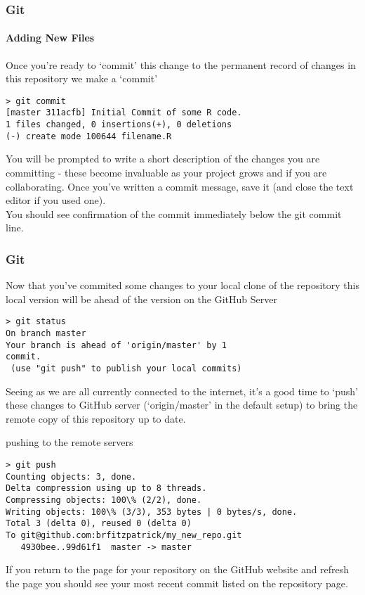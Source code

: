 \documentclass[xcolor=dvipsnames]{beamer}
\begin{document}
\begin{frame}[fragile]
\frametitle{Git}
\framesubtitle{Adding New Files}
Once you're ready to `commit' this change to the permanent record of changes in this repository we make a `commit'
\begin{block}{}
\begin{lstlisting}
> git commit
[master 311acfb] Initial Commit of some R code.
1 files changed, 0 insertions(+), 0 deletions
(-) create mode 100644 filename.R
\end{lstlisting}
\end{block}
You will be prompted to write a short description of the changes you are committing - these become invaluable as your project grows and if you are collaborating.
Once you've written a commit message, save it (and close the text editor if you used one).\\
You should see confirmation of the commit immediately below the git commit line.
\end{frame}

\begin{frame}[fragile]
\frametitle{Git}
Now that you've commited some changes to your local clone of the repository this local version will be ahead of the version on the GitHub Server
\begin{block}{}
\begin{lstlisting}
> git status
On branch master
Your branch is ahead of 'origin/master' by 1
commit.
 (use "git push" to publish your local commits)
\end{lstlisting}
\end{block}
Seeing as we are all currently connected to the internet, it's a good time to `push' these changes to GitHub server (`origin/master' in the default setup) to bring the remote copy of this repository up to date.
\end{frame}

\begin{frame}[fragile]
\begin{block}{pushing to the remote servers}
\begin{lstlisting}
> git push
Counting objects: 3, done.
Delta compression using up to 8 threads.
Compressing objects: 100\% (2/2), done.
Writing objects: 100\% (3/3), 353 bytes | 0 bytes/s, done.
Total 3 (delta 0), reused 0 (delta 0)
To git@github.com:brfitzpatrick/my_new_repo.git
   4930bee..99d61f1  master -> master
\end{lstlisting}
\end{block}
If you return to the page for your repository on the GitHub website and refresh the page you should see your most recent commit listed on the repository page.
\end{frame}
\end{document}
